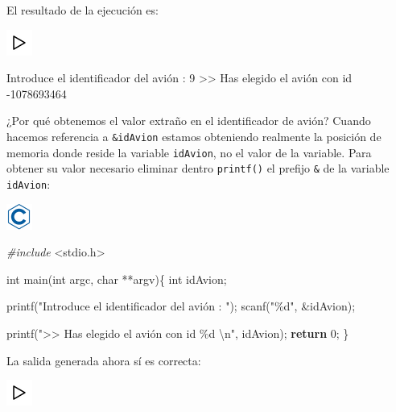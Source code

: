\documentclass[
]{book}
\newenvironment{Shaded}{\begin{snugshade}}{\end{snugshade}}
\newcommand{\ControlFlowTok}[1]{\textcolor[rgb]{0.13,0.29,0.53}{\textbf{#1}}}
\newcommand{\DataTypeTok}[1]{\textcolor[rgb]{0.13,0.29,0.53}{#1}}
\newcommand{\DecValTok}[1]{\textcolor[rgb]{0.00,0.00,0.81}{#1}}
\newcommand{\ImportTok}[1]{#1}
\newcommand{\NormalTok}[1]{#1}
\newcommand{\PreprocessorTok}[1]{\textcolor[rgb]{0.56,0.35,0.01}{\textit{#1}}}
\newcommand{\SpecialCharTok}[1]{\textcolor[rgb]{0.00,0.00,0.00}{#1}}
\newcommand{\StringTok}[1]{\textcolor[rgb]{0.31,0.60,0.02}{#1}}
\begin{document}
El resultado de la ejecución es:

\includegraphics{./img/play.png}

\begin{Shaded}
\begin{Highlighting}[]
\NormalTok{Introduce el identificador del avión : }\DecValTok{9}
\NormalTok{\textgreater{}\textgreater{} Has elegido el avión con id {-}}\DecValTok{1078693464}
\end{Highlighting}
\end{Shaded}

¿Por qué obtenemos el valor extraño en el identificador de avión? Cuando hacemos referencia a \texttt{\&idAvion} estamos obteniendo realmente la posición de memoria donde reside la variable \texttt{idAvion}, no el valor de la variable. Para obtener su valor necesario eliminar dentro \texttt{printf()} el prefijo \texttt{\&} de la variable \texttt{idAvion}:

\includegraphics{./img/c.png}

\begin{Shaded}
\begin{Highlighting}[]
\PreprocessorTok{\#include }\ImportTok{\textless{}stdio.h\textgreater{}}

\DataTypeTok{int}\NormalTok{ main(}\DataTypeTok{int}\NormalTok{ argc, }\DataTypeTok{char}\NormalTok{ **argv)\{}
    \DataTypeTok{int}\NormalTok{ idAvion;}

\NormalTok{    printf(}\StringTok{"Introduce el identificador del avión : "}\NormalTok{);}
\NormalTok{    scanf(}\StringTok{"\%d"}\NormalTok{, \&idAvion);}
    
\NormalTok{    printf(}\StringTok{"\textgreater{}\textgreater{} Has elegido el avión con id \%d }\SpecialCharTok{\textbackslash{}n}\StringTok{"}\NormalTok{, idAvion);}
    \ControlFlowTok{return} \DecValTok{0}\NormalTok{;}
\NormalTok{\}}
\end{Highlighting}
\end{Shaded}

La salida generada ahora sí es correcta:

\includegraphics{./img/play.png}
\end{document}

